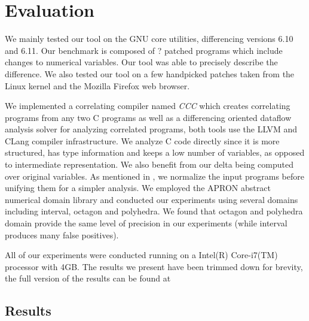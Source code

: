 \section{Evaluation}\label{Se:Evaluation}
We mainly tested our tool on the GNU core utilities, differencing versions 6.10 and 6.11. Our benchmark is composed of ? patched programs which include changes to numerical variables. Our tool was able to precisely describe the difference. We also tested our tool on a few handpicked patches taken from the Linux kernel and the Mozilla Firefox web browser.

We implemented a correlating compiler named \emph{CCC} which creates correlating programs from any two C programs as well as a differencing oriented dataflow analysis solver for analyzing correlated programs, both tools use the LLVM and CLang compiler infrastructure. We analyze C code directly since it is more structured, has type information and keeps a low number of variables, as opposed to intermediate representation. We also benefit from our delta being computed over original variables. As mentioned in , we normalize the input programs before unifying them for a simpler analysis. We employed the APRON abstract numerical domain library and conducted our experiments using several domains including interval, octagon and polyhedra. We found that octagon and polyhedra domain provide the same level of precision in our experiments (while interval produces many false positives). 

All of our experiments were conducted running on a Intel(R) Core-i7(TM) processor with 4GB. The results we present have been trimmed down for brevity, the full version of the results can be found at 

\subsection{Results}

%

